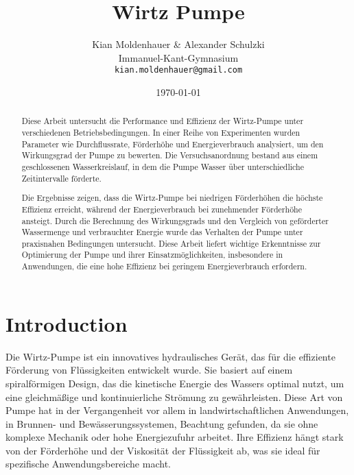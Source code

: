 \documentclass[12pt]{article}
\begin{document}
\title{Wirtz Pumpe}
\author{Kian Moldenhauer \& Alexander Schulzki\\Immanuel-Kant-Gymnasium\\\texttt{kian.moldenhauer@gmail.com}}
\date{\today} %
\maketitle

\begin{abstract}
Diese Arbeit untersucht die Performance und Effizienz der Wirtz-Pumpe unter verschiedenen Betriebsbedingungen. In einer Reihe von Experimenten wurden Parameter wie Durchflussrate, Förderhöhe und Energieverbrauch analysiert, um den Wirkungsgrad der Pumpe zu bewerten. Die Versuchsanordnung bestand aus einem geschlossenen Wasserkreislauf, in dem die Pumpe Wasser über unterschiedliche Zeitintervalle förderte.

Die Ergebnisse zeigen, dass die Wirtz-Pumpe bei niedrigen Förderhöhen die höchste Effizienz erreicht, während der Energieverbrauch bei zunehmender Förderhöhe ansteigt. Durch die Berechnung des Wirkungsgrads und den Vergleich von geförderter Wassermenge und verbrauchter Energie wurde das Verhalten der Pumpe unter praxisnahen Bedingungen untersucht. Diese Arbeit liefert wichtige Erkenntnisse zur Optimierung der Pumpe und ihrer Einsatzmöglichkeiten, insbesondere in Anwendungen, die eine hohe Effizienz bei geringem Energieverbrauch erfordern.
\end{abstract}

\tableofcontents  %
\newpage          %

\section{Introduction}
Die Wirtz-Pumpe ist ein innovatives hydraulisches Gerät, das für die effiziente Förderung von Flüssigkeiten entwickelt wurde. Sie basiert auf einem spiralförmigen Design, das die kinetische Energie des Wassers optimal nutzt, um eine gleichmäßige und kontinuierliche Strömung zu gewährleisten. Diese Art von Pumpe hat in der Vergangenheit vor allem in landwirtschaftlichen Anwendungen, in Brunnen- und Bewässerungssystemen, Beachtung gefunden, da sie ohne komplexe Mechanik oder hohe Energiezufuhr arbeitet. Ihre Effizienz hängt stark von der Förderhöhe und der Viskosität der Flüssigkeit ab, was sie ideal für spezifische Anwendungsbereiche macht.
\end{document}
